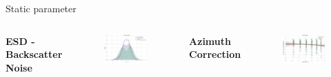 \documentclass[10pt,ignorenonframetext,xcolor={dvipsnames, table}]{beamer}
\begin{document}
\begin{frame}{Static parameter}

\begin{columns}


\textbf{ESD - Backscatter Noise}

\begin{figure}
\includegraphics[width=.9\textwidth]{./figures/esd_difference_GPI1813086.png}
\end{figure}


\textbf{Azimuth Correction}

\begin{figure}
\includegraphics[width=.9\textwidth]{./figures/azimuth_difference_GPI1263245.png}
\end{figure}

\end{columns}

\end{frame}
\end{document}
